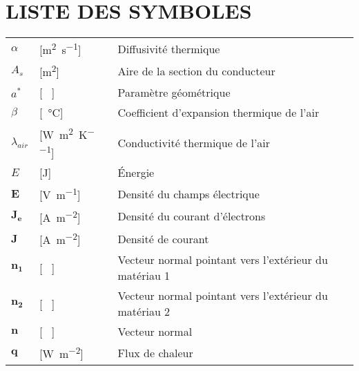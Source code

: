 \chapter*{LISTE DES SYMBOLES}
\pagestyle{pagenumber}
%

%
\begin{longtable}{l p{2.5cm} p{4in}}
	$\alpha$         & [\si{\square\metre\per\second}]                     & Diffusivité thermique                                        \\
	$A_s$            & [\si{\square\metre}]                                & Aire de la section du conducteur                             \\
	$a^*$            & [ \ ]                                               & Paramètre géométrique                                        \\
	$\beta$          & [\si{\per\celsius}]                                 & Coefficient d'expansion thermique de l'air                   \\
	$\lambda_{air}$  & [\si{\watt\per\square\metre\per\kelvin}]            & Conductivité thermique de l'air                              \\
	$E$              & [\si{\joule}]                                       & Énergie                                                      \\
	$\mathbf{E}$     & [\si{\volt\per\metre}]                              & Densité du champs électrique                                 \\
	$\mathbf{J_e}$   & [\si{\ampere\per\square\metre}]                     & Densité du courant d'électrons                               \\
	$\mathbf{J}$     & [\si{\ampere\per\square\metre}]                     & Densité de courant                                           \\
	$\mathbf{n_1}$   & [ \ ]                                               & Vecteur normal pointant vers l'extérieur du matériau 1       \\
	$\mathbf{n_2}$   & [ \ ]                                               & Vecteur normal pointant vers l'extérieur du matériau 2       \\
	$\mathbf{n}$     & [ \ ]                                               & Vecteur normal                                               \\
	$\mathbf{q}$     & [\si{\watt\per\square\metre}]                       & Flux de chaleur                                              \\

\end{longtable}
